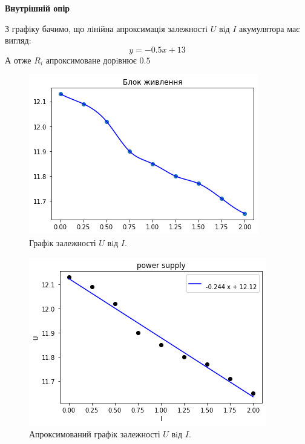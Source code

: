 \documentclass[a4paper,12pt]{article}
\newcommand{\ri}{R_i}
\begin{document}
	\begin{flushleft}
		\textbf{Внутрішній опір}
	\end{flushleft}
	З графiку бачимо, що лiнiйна апроксимацiя залежностi $U$ вiд $I$ акумулятора має вигляд:\\ $$y=-0.5x+13$$
	А отже $\ri$ апроксимоване дорiвнює $0.5$
	
\newpage
	\begin{figure}[h]
		\centering
		\begin{minipage}[h]{0.5\linewidth}
			\includegraphics[width=1\linewidth]{Prt sc/Figure_3_1.jpeg} \caption{Графiк залежності $U$ вiд $I$.} 
		\end{minipage}
	\end{figure}
	\begin{figure}[h]
		\centering
		\begin{minipage}[h]{0.5\linewidth}
			\includegraphics[width=1\linewidth]{Prt sc/Figure_3_2.jpeg}
		\end{minipage}
		\caption{Апроксимований графiк залежності $U$ вiд $I$.}
	\end{figure}
	
\end{document}
